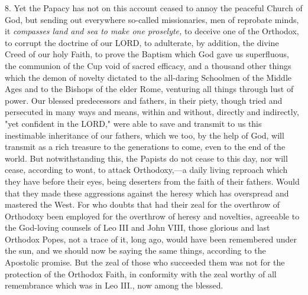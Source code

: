 8. Yet the Papacy has not on this account ceased to annoy the peaceful
Church of God, but sending out everywhere so-called missionaries, men of
reprobate minds, it \emph{compasses land and sea to make one proselyte,}
to deceive one of the Orthodox, to corrupt the doctrine of our LORD, to
adulterate, by addition, the divine Creed of our holy Faith, to prove
the Baptism which God gave us superfluous, the communion of the Cup void
of sacred efficacy, and a thousand other things which the demon of
novelty dictated to the all-daring Schoolmen of the Middle Ages and to
the Bishops of the elder Rome, venturing all things through lust of
power. Our blessed predecessors and fathers, in their piety, though
tried and persecuted in many ways and means, within and without,
directly and indirectly, "yet confident in the LORD," were able to save
and transmit to us this inestimable inheritance of our fathers, which we
too, by the help of God, will transmit as a rich treasure to the
generations to come, even to the end of the world. But notwithstanding
this, the Papists do not cease to this day, nor will cease, according to
wont, to attack Orthodoxy,---a daily living reproach which they have
before their eyes, being deserters from the faith of their fathers.
Would that they made these aggressions against the heresy which has
overspread and mastered the West. For who doubts that had their zeal for
the overthrow of Orthodoxy been employed for the overthrow of heresy and
novelties, agreeable to the God-loving counsels of Leo III and John
VIII, those glorious and last Orthodox Popes, not a trace of it, long
ago, would have been remembered under the sun, and we should now be
saying the same things, according to the Apostolic promise. But the zeal
of those who succeeded them was not for the protection of the Orthodox
Faith, in conformity with the zeal worthy of all remembrance which was
in Leo III., now among the blessed.

